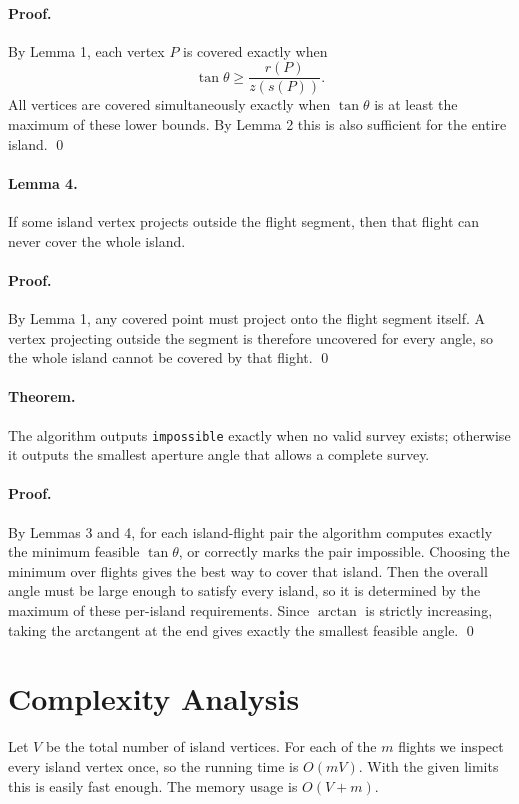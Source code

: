 \documentclass[11pt]{article}
\begin{document}
\paragraph{Proof.}
By Lemma 1, each vertex $P$ is covered exactly when
\[
    \tan\theta \ge \frac{r(P)}{z(s(P))}.
\]
All vertices are covered simultaneously exactly when $\tan\theta$ is at least the maximum of these lower
bounds. By Lemma 2 this is also sufficient for the entire island. \qed

\paragraph{Lemma 4.}
If some island vertex projects outside the flight segment, then that flight can never cover the whole
island.

\paragraph{Proof.}
By Lemma 1, any covered point must project onto the flight segment itself. A vertex projecting outside the
segment is therefore uncovered for every angle, so the whole island cannot be covered by that flight. \qed

\paragraph{Theorem.}
The algorithm outputs \texttt{impossible} exactly when no valid survey exists; otherwise it outputs the
smallest aperture angle that allows a complete survey.

\paragraph{Proof.}
By Lemmas 3 and 4, for each island-flight pair the algorithm computes exactly the minimum feasible
$\tan\theta$, or correctly marks the pair impossible. Choosing the minimum over flights gives the best way
to cover that island. Then the overall angle must be large enough to satisfy every island, so it is
determined by the maximum of these per-island requirements. Since $\arctan$ is strictly increasing, taking
the arctangent at the end gives exactly the smallest feasible angle. \qed

\section*{Complexity Analysis}

Let $V$ be the total number of island vertices. For each of the $m$ flights we inspect every island vertex
once, so the running time is $O(mV)$. With the given limits this is easily fast enough. The memory usage
is $O(V + m)$.
\end{document}
